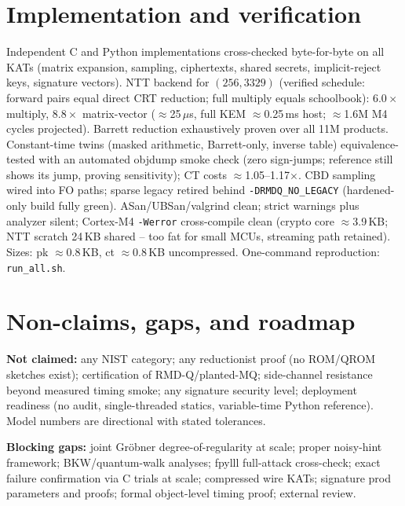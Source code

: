 \section{Implementation and verification}
\label{sec:impl}

Independent C and Python implementations cross-checked byte-for-byte on
all KATs (matrix expansion, sampling, ciphertexts, shared secrets,
implicit-reject keys, signature vectors). NTT backend for $(256,3329)$
(verified schedule: forward pairs equal direct CRT reduction; full
multiply equals schoolbook): $6.0\times$ multiply, $8.8\times$ matrix-vector
($\approx$25\,$\mu$s, full KEM $\approx$0.25\,ms host; $\approx$1.6M M4
cycles projected). Barrett reduction exhaustively proven over all 11M
products. Constant-time twins (masked arithmetic, Barrett-only, inverse
table) equivalence-tested with an automated objdump smoke check (zero
sign-jumps; reference still shows its jump, proving sensitivity); CT costs
$\approx$1.05--1.17$\times$. CBD sampling wired into FO paths; sparse
legacy retired behind \texttt{-DRMDQ\_NO\_LEGACY} (hardened-only build
fully green). ASan/UBSan/valgrind clean; strict warnings plus analyzer
silent; Cortex-M4 \texttt{-Werror} cross-compile clean (crypto core
$\approx$3.9\,KB; NTT scratch 24\,KB shared -- too fat for small MCUs,
streaming path retained). Sizes: pk $\approx$0.8\,KB, ct $\approx$0.8\,KB
uncompressed. One-command reproduction: \texttt{run\_all.sh}.

\section{Non-claims, gaps, and roadmap}
\label{sec:nonclaims}
\label{sec:gaps}
\label{sec:repro}

\textbf{Not claimed:} any NIST category; any reductionist proof (no ROM/QROM
sketches exist); certification of RMD-Q/planted-MQ; side-channel resistance
beyond measured timing smoke; any signature security level; deployment
readiness (no audit, single-threaded statics, variable-time Python
reference). Model numbers are directional with stated tolerances.

\textbf{Blocking gaps:} joint Gr\"obner degree-of-regularity at scale;
proper noisy-hint framework; BKW/quantum-walk analyses; fpylll full-attack
cross-check; exact failure confirmation via C trials at scale; compressed
wire KATs; signature prod parameters and proofs; formal object-level timing
proof; external review.

